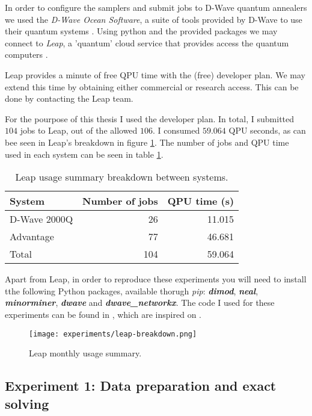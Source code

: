 In order to configure the samplers and submit jobs to D-Wave quantum annealers we used the \emph{D-Wave Ocean Software}, a suite of tools provided by D-Wave to use their quantum systems \cite{DWave-OceanDoc}. Using python and the provided packages we may connect to \emph{Leap}, a 'quantum' cloud service that provides access the quantum computers \cite{DWave-Leap}.

Leap provides a minute of free QPU time with the (free) developer plan. We may extend this time by obtaining either commercial or research access. This can be done by contacting the Leap team.

For the pourpose of this thesis I used the developer plan. In total, I submitted $104$ jobs to Leap, out of the allowed $106$. I consumed $59.064$ QPU seconds, as can bee seen in Leap's breakdown in figure \ref{fig:leap-breakdown}. The number of jobs and QPU time used in each system can be seen in table \ref{tab:leap-breakdown}.

\begin{table}[H]
	\centering
	\begin{tabular}{lrr}
		\textbf{System} & \textbf{Number of jobs} & \textbf{QPU time (s)} \\
		\hline
		D-Wave 2000Q	& 26	& 11.015	\\
		Advantage		& 77	& 46.681	\\
		Total			& 104	& 59.064                     
	\end{tabular}
	\caption{Leap usage summary breakdown between systems.}
	\label{tab:leap-breakdown}
\end{table}

Apart from Leap, in order to reproduce these experiments you will need to install tthe following Python packages, available thorugh \emph{pip}: \textbf{\emph{dimod}}, \textbf{\emph{neal}}, \textbf{\emph{minorminer}}, \textbf{\emph{dwave}} and \textbf{\emph{dwave\_networkx}}. The code I used for these experiments can be found in \cite{thesis-code}, which are inspired on \cite{Sarkar2020}.

\begin{figure}[H]
	\texttt{[image: experiments/leap-breakdown.png]}
	\centering
	\caption{Leap monthly usage summary.}
	\label{fig:leap-breakdown}
\end{figure}


\subsection{Experiment 1: Data preparation and exact solving}


